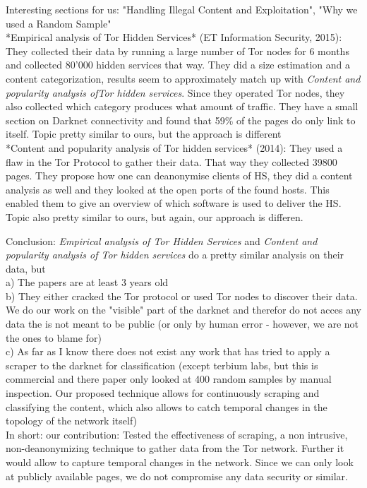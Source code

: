 Interesting sections for us: "Handling Illegal Content and Exploitation", "Why we used a Random Sample"\\
*Empirical analysis of Tor Hidden Services* (ET Information Security, 2015): They collected their data by running a large number of Tor nodes for 6 months and collected 80'000 hidden services that way. They did a size estimation and a content categorization, results seem to approximately match up with \textit{Content and popularity analysis ofTor hidden services}. Since they operated Tor nodes, they also collected which category produces what amount of traffic. They have a small section on Darknet connectivity and found that 59\% of the pages do only link to itself.
Topic pretty similar to ours, but the approach is different \\   
*Content and popularity analysis of Tor hidden services* (2014): They used a flaw in the Tor Protocol to gather their data. That way they collected 39800 pages. They propose how one can deanonymise clients of HS, they did a content analysis as well and they looked at the open ports of the found hosts. This enabled them to give an overview of which software is used to deliver the HS.
Topic also pretty similar to ours, but again, our approach is differen.

Conclusion: \textit{Empirical analysis of Tor Hidden Services} and \textit{Content and popularity analysis of Tor hidden services} do a pretty similar analysis on their data, but\\
a) The papers are at least 3 years old \\
b) They either cracked the Tor protocol or used Tor nodes to discover their data. We do our work on the "visible" part of the darknet and therefor do not acces any data the is not meant to be public (or only by human error - however, we are not the ones to blame for)\\
c) As far as I know there does not exist any work that has tried to apply a scraper to the darknet for classification (except terbium labs, but this is commercial and there paper only looked at 400 random samples by manual inspection. Our proposed technique allows for continuously scraping and classifying the content, which also allows to catch temporal changes in the topology of the network itself)\\
In short: our contribution: Tested the effectiveness of scraping, a non intrusive, non-deanonymizing technique to gather data from the Tor network. Further it would allow to capture temporal changes in the network. Since we can only look at publicly available pages, we do not compromise any data security or similar.




